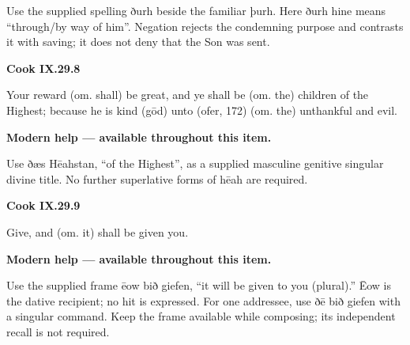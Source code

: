 Use the supplied spelling ðurh beside the familiar þurh. Here ðurh hine means “through/\allowbreak{}by way of him”. Negation rejects the condemning purpose and contrasts it with saving; it does not deny that the Son was sent.

\par\begin{minipage}{\linewidth}\raggedright
\textbf{Cook IX.29.8}

Your reward (om. shall) be great, and ye shall be (om. the) children of the Highest; because he is kind (gōd) unto (ofer, 172) (om. the) unthankful and evil.

\textbf{Modern help — available throughout this item.}

\end{minipage}\par\addvspace{4pt}

Use ðæs Hēahstan, “of the Highest”, as a supplied masculine genitive singular divine title. No further superlative forms of hēah are required.

\par\begin{minipage}{\linewidth}\raggedright
\textbf{Cook IX.29.9}

Give, and (om. it) shall be given you.

\textbf{Modern help — available throughout this item.}

\end{minipage}\par\addvspace{4pt}

Use the supplied frame ēow bið giefen, “it will be given to you (plural).” Ēow is the dative recipient; no hit is expressed. For one addressee, use ðē bið giefen with a singular command. Keep the frame available while composing; its independent recall is not required.

